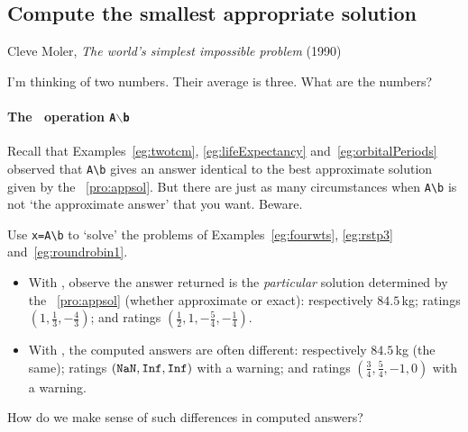 \subsection{Compute the smallest appropriate solution}
\label{sec:csap}

\begin{quoted}{\parbox[t]{0.5\linewidth}{Cleve Moler, \emph{The world's simplest impossible problem} (1990)}}
I'm thinking of two numbers.  Their average is three.  What are the numbers?
\end{quoted}

\begin{comment}
Chapter~20 of the book by \cite{Higham1996} has some aspects of this section (including pseudo-inverse).
Matlab and Octave currently differ in that octave returns the smallest solution, but matlab returns a solution with at least \(m\)~non-zero elements??
\end{comment}

\paragraph{The \script\ operation \texttt{A$\backslash$b}}
Recall that Examples~\ref{eg:twotcm}, \ref{eg:lifeExpectancy} and~\ref{eg:orbitalPeriods} observed that \verb|A\b| gives an answer identical to the best approximate solution given by the \svd\ \autoref{pro:appsol}.
But there are just as many circumstances when \verb|A\b| is not `the approximate answer' that you want.
Beware.


\begin{example} \label{eg:}
Use \verb|x=A\b| to `solve' the problems of Examples~\ref{eg:fourwts}, \ref{eg:rstp3} and~\ref{eg:roundrobin1}.
\begin{itemize}
\item With \script[2], observe the answer returned is the \emph{particular} solution determined by the \svd\ \autoref{pro:appsol} (whether approximate or exact): 
respectively \(84.5\)\,kg; 
ratings \((1,\frac13,-\frac43)\); and 
ratings \((\frac12,1,-\frac54,-\frac14)\). %
\item With \script[1], the computed answers are often different: 
respectively \(84.5\)\,kg (the same); 
ratings \((\verb|NaN|,\verb|Inf|,\verb|Inf|)\) with a warning; 
and ratings \((\tfrac34,\tfrac54,-1,0)\) with a warning. %
\end{itemize}
How do we make sense of such differences in computed answers?
\end{example}

